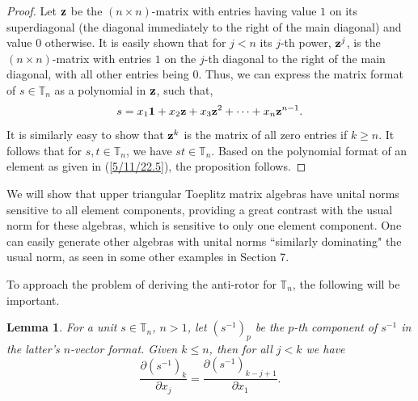\documentclass{amsart}
\newtheorem{lemma}[theorem]{Lemma}
\theoremstyle{definition}
\numberwithin{theorem}{section}
\numberwithin{equation}{section}
\begin{document}
 \begin{proof}
Let ${\bf z}$ be the $(n \times n)$-matrix with entries having value $1$ on its superdiagonal  (the diagonal immediately to the right of the main diagonal) and value $0$ otherwise.  It is easily shown that for $j<n$ its $j$-th power, ${\bf z}^j$, is the $(n\times n)$-matrix with entries $1$ on the $j$-th diagonal to the right of the main diagonal, with all other entries being $0$.   Thus, we can express the matrix format of $s\in\mathbb{T}_n$ as a polynomial in ${\bf z}$, such that,
\begin{equation}\label{5/11/22.5} s = x_1 {\bf 1} + x_2 {\bf z} + x_3 {\bf z}^2 + \cdots + x_n {\bf z}^{n-1}.\end{equation}  It is similarly easy to show that ${\bf z}^k$ is the matrix of all zero entries if $k\ge n$.  It follows that for $s,t\in \mathbb{T}_n$, we have $st\in \mathbb{T}_n$.   Based on the polynomial format of an element as given in (\ref{5/11/22.5}), the proposition follows.
 \end{proof}
 

We will show that upper triangular Toeplitz matrix algebras have unital norms sensitive to all element components, providing a great contrast with the usual norm for these algebras, which is sensitive to only one element component.  One can easily generate other algebras with unital norms ``similarly dominating" the usual norm, as seen in some other examples in Section 7.

To approach the problem of deriving the anti-rotor for $\mathbb{T}_n$, the following will be important.

\begin{lemma} \label{5/7/22.15} For a unit $s\in \mathbb{T}_n$,  $n>1$, let $\left( s^{-1} \right)_p$ be the $p$-th component of $s^{-1}$ in the latter's $n$-vector format.  Given $k\le n$, then for all $j<k$ we have \begin{equation}\label{5/6/22.10} \frac{\partial \left( s^{-1} \right)_k}{\partial x_j} = \frac{\partial \left( s^{-1} \right)_{k-j+1}}{\partial x_1}.\end{equation}
\end{lemma}
\end{document}
